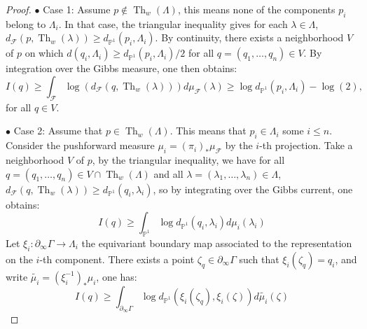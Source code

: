 \documentclass[12pt]{amsbook}%
\theoremstyle{definition}
\theoremstyle{remark}
\numberwithin{section}{chapter}
\numberwithin{subsection}{section}
\numberwithin{figure}{chapter}
\DeclareMathOperator{\Th}{Th}
\def\bP{{\mathbb{P}}}
\def\cF{{\mathscr{F}}}
\begin{document}
{{\begin{proof}
$\bullet$ Case 1: Assume $p \notin \Th_w(\Lambda)$, this means none of the components $p_i $ belong to $\Lambda_i$. 
In that case, the triangular inequality gives for each $\lambda \in \Lambda$,  $d_{\cF}(p, \Th_w(\lambda)) \geqslant d_{\bP^1}(p_i, \Lambda_i)$. By continuity, there exists a neighborhood $V$ of $p$ on which $d(q_i, \Lambda_i) \geqslant  d_{\bP^1}(p_i, \Lambda_i)/2$ for all $q=(q_1,\ldots, q_n) \in V$.
By integration over the Gibbs measure, one then obtains:
\begin{equation}
I(q) \geqslant \int_{\cF} \log(d_{\cF} (q, \Th_w(\lambda))) d\mu_{\cF}(\lambda) \geqslant \log d_{\bP^1}(p_i,\Lambda_i) - \log(2) , 
\end{equation}
for all $q \in V$.  

\medskip

$\bullet$ Case 2: Assume that $p \in \Th_w(\Lambda)$. This means that $p_i \in \Lambda_i$ some $i\leqslant n$. 
 Consider the pushforward measure $\mu_i= (\pi_i)_* \mu_{\cF}$ by the $i$-th projection. 
 Take a neighborhood $V$ of $p$,
by the triangular inequality, we have for all $q=(q_1,\ldots,q_n)\in V \cap \Th_w(\Lambda)$ and all $\lambda=(\lambda_1,\ldots, \lambda_n) \in \Lambda$, $d_{\cF}(q, \Th_w(\lambda)) \geqslant d_{\bP^1}(q_i, \lambda_i)$, so by integrating over the Gibbs current, one obtains:
\begin{equation*}
I(q) \geqslant \int_{\bP^1} \log d_{\bP^1} (q_i,\lambda_i ) d\mu_i(\lambda_i)
\end{equation*}
Let $\xi_i \colon \partial_\infty \Gamma \to \Lambda_i$ the equivariant boundary map associated to the representation on the $i$-th component. There exists a point $\zeta_q \in \partial_\infty \Gamma$ such that $\xi_i(\zeta_q) = q_i$, and write $\tilde{\mu_i} = (\xi_i^{-1})_* \mu_i$, one has: 
\begin{equation*}
I(q) \geqslant \int_{\partial_\infty \Gamma} \log d_{\bP^1}(\xi_i(\zeta_q), \xi_i(\zeta)) d \tilde{\mu_i}(\zeta)
\end{equation*}


\end{proof}}}
\end{document}
